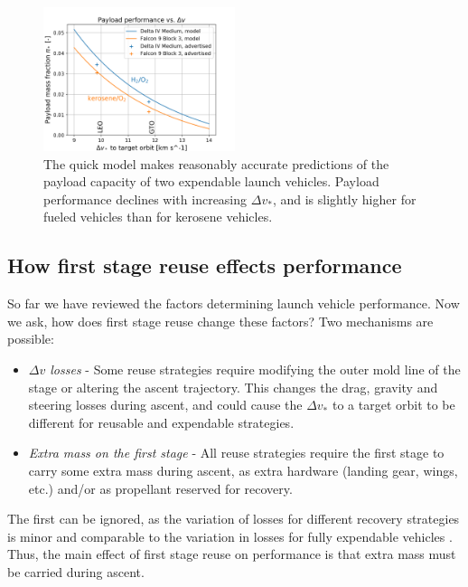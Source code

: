 \documentclass[conf]{new-aiaa}
\begin{document}
\begin{multicols}{2}
\begin{figure}[H]
    \centering
    \includegraphics[width=0.5\textwidth]{../../lvreuse/analysis/performance/plots/payload_vs_dv}
    \caption{\label{fig:payload_vs_dv} The quick model makes reasonably accurate predictions of the payload capacity of two expendable launch vehicles. Payload performance declines with increasing $\Delta v_*$, and is slightly higher for  fueled vehicles than for kerosene vehicles.}
\end{figure}

\subsection{How first stage reuse effects performance}
So far we have reviewed the factors determining launch vehicle performance. Now we ask, how does first stage reuse change these factors? Two mechanisms are possible:

\begin{itemize}
    \item \emph{$\Delta v$ losses} - Some reuse strategies require modifying the outer mold line of the stage or altering the ascent trajectory. This changes the drag, gravity and steering losses during ascent, and could cause the $\Delta v_*$ to a target orbit to be different for reusable and expendable strategies.
    \item \emph{Extra mass on the first stage} - All reuse strategies require the first stage to carry some extra mass during ascent, as extra hardware (landing gear, wings, etc.) and/or as propellant reserved for recovery.
\end{itemize}

The first can be ignored, as the variation of losses for different recovery strategies is minor and comparable to the variation in losses for fully expendable vehicles \cite{Stappert2017}. Thus, the main effect of first stage reuse on performance is that extra mass must be carried during ascent.


\end{multicols}
\end{document}
